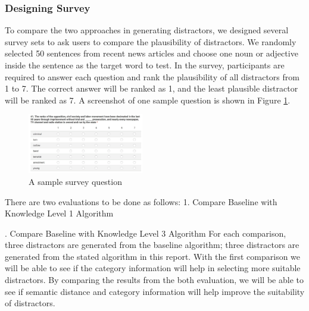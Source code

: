 




\subsubsection{Designing Survey}
To compare the two approaches in generating distractors, we designed several survey sets to ask users to compare the plausibility of distractors. We randomly selected 50 sentences from recent news articles and choose one noun or adjective inside the sentence as the target word to test. In the survey, participants are required to answer each question and rank the plausibility of all distractors from 1 to 7. The correct answer will be ranked as 1, and the least plausible distractor will be ranked as 7. A screenshot of one sample question is shown in Figure \ref{fig:distractor_1}.
\\
\begin{figure}[ht]
   \centering
   \includegraphics[width=0.45\textwidth]{distractor_1.jpg}
   \caption{A sample survey question}
   \label{fig:distractor_1}
\end{figure}
There are two evaluations to be done as follows:
1.  Compare Baseline with Knowledge Level 1 Algorithm

.  Compare Baseline with Knowledge Level 3 Algorithm
For each comparison, three distractors are generated from the baseline algorithm; three distractors are generated from the stated algorithm in this report. With the first comparison we will be able to see if the category information will help in selecting more suitable distractors. By comparing the results from the both evaluation, we will be able to see if semantic distance and category information will help improve the suitability of distractors.

